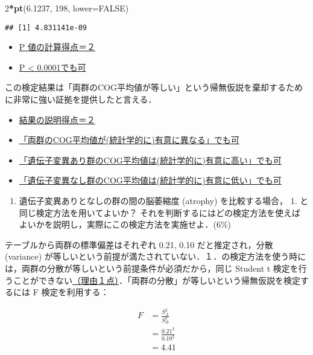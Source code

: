 \documentclass[11pt,]{problemset}
\newenvironment{Shaded}{\begin{snugshade}}{\end{snugshade}}
\newcommand{\DataTypeTok}[1]{\textcolor[rgb]{0.13,0.29,0.53}{#1}}
\newcommand{\DecValTok}[1]{\textcolor[rgb]{0.00,0.00,0.81}{#1}}
\newcommand{\FloatTok}[1]{\textcolor[rgb]{0.00,0.00,0.81}{#1}}
\newcommand{\KeywordTok}[1]{\textcolor[rgb]{0.13,0.29,0.53}{\textbf{#1}}}
\newcommand{\NormalTok}[1]{#1}
\newcommand{\OperatorTok}[1]{\textcolor[rgb]{0.81,0.36,0.00}{\textbf{#1}}}
\newcommand{\OtherTok}[1]{\textcolor[rgb]{0.56,0.35,0.01}{#1}}
\providecommand{\tightlist}{%
  \setlength{\itemsep}{0pt}\setlength{\parskip}{0pt}}
\begin{document}
\begin{Shaded}
\begin{Highlighting}[]
\DecValTok{2}\OperatorTok{*}\KeywordTok{pt}\NormalTok{(}\FloatTok{6.1237}\NormalTok{, }\DecValTok{198}\NormalTok{, }\DataTypeTok{lower=}\OtherTok{FALSE}\NormalTok{)}
\end{Highlighting}
\end{Shaded}

\begin{verbatim}
## [1] 4.831141e-09
\end{verbatim}

\begin{itemize}
\item
  \underline{P 値の計算得点＝２}
\item
  \underline{P < 0.0001でも可}
\end{itemize}

この検定結果は「両群のCOG平均値が等しい」という帰無仮説を棄却するために非常に強い証拠を提供したと言える．

\begin{itemize}
\item
  \underline{結果の説明得点＝２}
\item
  \underline{「両群のCOG平均値が(統計学的に)有意に異なる」でも可}
\item
  \underline{「遺伝子変異あり群のCOG平均値は(統計学的に)有意に高い」でも可}
\item
  \underline{「遺伝子変異なし群のCOG平均値は(統計学的に)有意に低い」でも可}
\end{itemize}

\newpage

\begin{enumerate}
\def\labelenumi{\arabic{enumi}.}
\setcounter{enumi}{1}
\tightlist
\item
  遺伝子変異ありとなしの群の間の脳萎縮度 (atrophy) を比較する場合， 1.
  と同じ検定方法を用いてよいか？
  それを判断するにはどの検定方法を使えばよいかを説明し，実際にこの検定方法を実施せよ．(6\%)
\end{enumerate}

テーブルから両群の標準偏差はそれぞれ 0.21, 0.10 だと推定され，分散
(variance)
が等しいという前提が満たされていない．１．の検定方法を使う時には，両群の分散が等しいという前提条件が必須だから，同じ
Student t
検定を行うことができない\underline{（理由１点）}．「両群の分散」が等しいという帰無仮説を検定するには
F 検定を利用する：

\[
\begin{aligned}
F & = \frac{S^2_A}{S^2_B} \\
  & = \frac{0.21^2}{0.10^2} \\
  & = 4.41
\end{aligned}
\]
\end{document}
